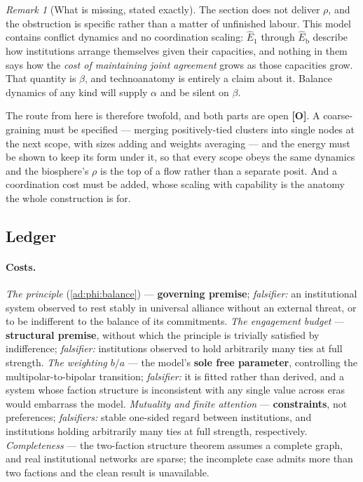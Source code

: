\documentclass[11pt]{article}
\numberwithin{equation}{section}
\theoremstyle{plain}
\theoremstyle{definition}
\theoremstyle{remark}
\newtheorem{remark}[theorem]{Remark}
\begin{document}
\begin{remark}[What is missing, stated exactly]\label{ad:rem:missing}
The section does not deliver $\rho$, and the obstruction is specific
rather than a matter of unfinished labour. This model contains conflict
dynamics and no coordination scaling: $\hat E_1$ through
$\hat E_{\mathrm b}$ describe how institutions arrange themselves given
their capacities, and nothing in them says how the \emph{cost of
maintaining joint agreement} grows as those capacities grow. That
quantity is $\beta$, and technoanatomy is entirely a claim about it.
Balance dynamics of any kind will supply $\alpha$ and be silent on
$\beta$.

The route from here is therefore twofold, and both parts are open
\textbf{[O]}. A coarse-graining must be specified --- merging
positively-tied clusters into single nodes at the next scope, with sizes
adding and weights averaging --- and the energy must be shown to keep
its form under it, so that every scope obeys the same dynamics and the
biosphere's $\rho$ is the top of a flow rather than a separate
posit. And a coordination cost must be added, whose scaling with
capability is the anatomy the whole construction is for.
\end{remark}

\subsection{Ledger}\label{ad:sub:ledger}

\paragraph{Costs.} \emph{The principle} (\ref{ad:phi:balance}) ---
\textbf{governing premise}; \emph{falsifier:} an institutional system
observed to rest stably in universal alliance without an external
threat, or to be indifferent to the balance of its commitments.
\emph{The engagement budget} --- \textbf{structural premise}, without
which the principle is trivially satisfied by indifference;
\emph{falsifier:} institutions observed to hold arbitrarily many ties
at full strength. \emph{The weighting $b/a$} --- the model's \textbf{sole free
parameter}, controlling the multipolar-to-bipolar transition;
\emph{falsifier:} it is fitted rather than derived, and a system whose
faction structure is inconsistent with any single value across eras
would embarrass the model. \emph{Mutuality and finite attention} ---
\textbf{constraints}, not preferences; \emph{falsifiers:} stable
one-sided regard between institutions, and institutions holding
arbitrarily many ties at full strength, respectively. \emph{Completeness} --- the two-faction
structure theorem assumes a complete graph, and real institutional
networks are sparse; the incomplete case admits more than two factions
and the clean result is unavailable.
\end{document}
